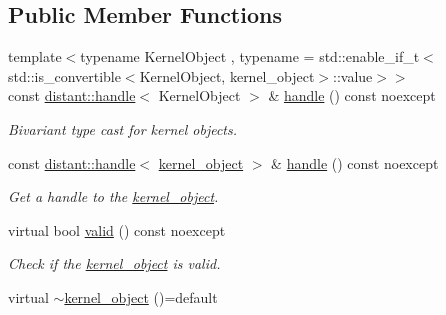\subsection*{Public Member Functions}
\begin{DoxyCompactItemize}
\item 
\mbox{\label{classdistant_1_1kernel__objects_1_1kernel__object_a460b6e2e735af256b6ef6c155c9bada7}} 
{\footnotesize template$<$typename Kernel\+Object , typename  = std\+::enable\+\_\+if\+\_\+t$<$std\+::is\+\_\+convertible$<$\+Kernel\+Object, kernel\+\_\+object$>$\+::value$>$$>$ }\\const \mbox{\hyperlink{classdistant_1_1handle}{distant\+::handle}}$<$ Kernel\+Object $>$ \& \mbox{\hyperlink{classdistant_1_1kernel__objects_1_1kernel__object_a460b6e2e735af256b6ef6c155c9bada7}{handle}} () const noexcept
\begin{DoxyCompactList}\small\item\em Bivariant type cast for kernel objects. \end{DoxyCompactList}\item 
const \mbox{\hyperlink{classdistant_1_1handle}{distant\+::handle}}$<$ \mbox{\hyperlink{classdistant_1_1kernel__objects_1_1kernel__object}{kernel\+\_\+object}} $>$ \& \mbox{\hyperlink{classdistant_1_1kernel__objects_1_1kernel__object_ad987412d770537d60500a007d7bc3d9e}{handle}} () const noexcept
\begin{DoxyCompactList}\small\item\em Get a handle to the \mbox{\hyperlink{classdistant_1_1kernel__objects_1_1kernel__object}{kernel\+\_\+object}}. \end{DoxyCompactList}\item 
virtual bool \mbox{\hyperlink{classdistant_1_1kernel__objects_1_1kernel__object_a07c26f8b2f2121367d9a71c64d3bf2c4}{valid}} () const noexcept
\begin{DoxyCompactList}\small\item\em Check if the \mbox{\hyperlink{classdistant_1_1kernel__objects_1_1kernel__object}{kernel\+\_\+object}} is valid. \end{DoxyCompactList}\item 
\mbox{\label{classdistant_1_1kernel__objects_1_1kernel__object_a7288c3a2239ab03b1e24ba6970349723}} 
virtual \mbox{\hyperlink{classdistant_1_1kernel__objects_1_1kernel__object_a7288c3a2239ab03b1e24ba6970349723}{$\sim$kernel\+\_\+object}} ()=default

\end{DoxyCompactItemize}
